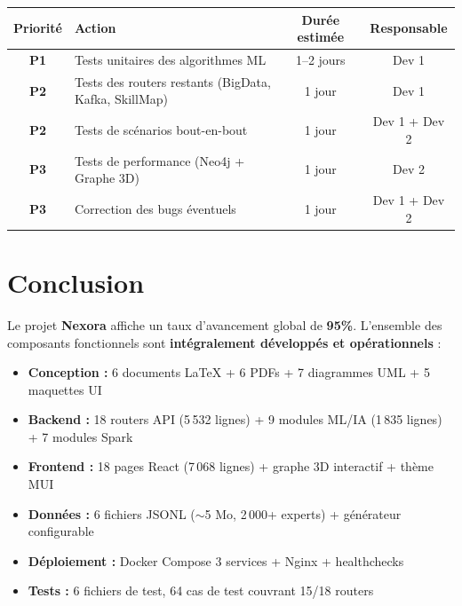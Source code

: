 \documentclass[12pt,a4paper]{article}
\begin{document}
\begin{center}
\renewcommand{\arraystretch}{1.3}
\begin{tabular}{|c|l|c|c|}
\hline
\rowcolor{bleu!15}
\textbf{Priorité} & \textbf{Action} & \textbf{Durée estimée} & \textbf{Responsable} \\
\hline
\cellcolor{rougeclair}\textbf{P1} & Tests unitaires des algorithmes ML & 1--2 jours & Dev 1 \\
\hline
\cellcolor{orangeclair}\textbf{P2} & Tests des routers restants (BigData, Kafka, SkillMap) & 1 jour & Dev 1 \\
\hline
\cellcolor{orangeclair}\textbf{P2} & Tests de scénarios bout-en-bout & 1 jour & Dev 1 + Dev 2 \\
\hline
\cellcolor{bleuclair}\textbf{P3} & Tests de performance (Neo4j + Graphe 3D) & 1 jour & Dev 2 \\
\hline
\cellcolor{bleuclair}\textbf{P3} & Correction des bugs éventuels & 1 jour & Dev 1 + Dev 2 \\
\hline
\end{tabular}
\end{center}

\vspace{0.5cm}
\begin{center}
\end{center}

\section{Conclusion}

Le projet \textbf{Nexora} affiche un taux d'avancement global de \textbf{95\%}. L'ensemble des composants fonctionnels sont \textbf{intégralement développés et opérationnels} :

\begin{itemize}[leftmargin=*]
    \item \textbf{Conception :} 6 documents LaTeX + 6 PDFs + 7 diagrammes UML + 5 maquettes UI
    \item \textbf{Backend :} 18 routers API (5\,532 lignes) + 9 modules ML/IA (1\,835 lignes) + 7 modules Spark
    \item \textbf{Frontend :} 18 pages React (7\,068 lignes) + graphe 3D interactif + thème MUI
    \item \textbf{Données :} 6 fichiers JSONL ($\sim$5 Mo, 2\,000+ experts) + générateur configurable
    \item \textbf{Déploiement :} Docker Compose 3 services + Nginx + healthchecks
    \item \textbf{Tests :} 6 fichiers de test, 64 cas de test couvrant 15/18 routers
\end{itemize}
\end{document}
